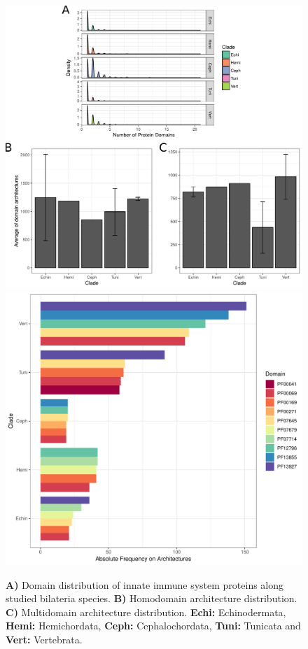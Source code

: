 \documentclass[11pt]{article}
\begin{document}
\begin{figure}[ht!]
\centering
\includegraphics[scale=0.73]{figures/completeDistributionDomains} \\
\includegraphics[scale=0.38]{figures/heterodomains_distr}
\caption{\textbf{A)} Domain distribution of innate immune system proteins along 
studied 
bilateria species. \textbf{B)} Homodomain architecture distribution. 
\textbf{C)} Multidomain architecture distribution. \textbf{Echi:} 
Echinodermata, \textbf{Hemi:} Hemichordata, \textbf{Ceph:} Cephalochordata, 
\textbf{Tuni:} Tunicata and \textbf{Vert:} Vertebrata.}
\label{fig:domainDistr}
\end{figure}
\end{document}
